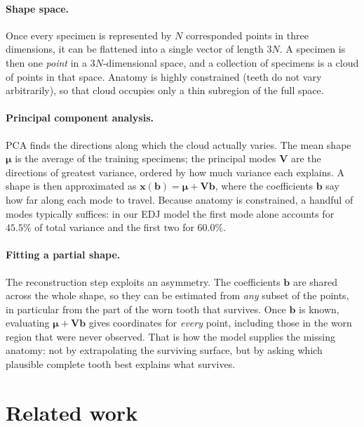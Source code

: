 \documentclass[10pt,a4paper,twocolumn]{article}
\begin{document}
\paragraph{Shape space.}
Once every specimen is represented by $N$ corresponded points in three
dimensions, it can be flattened into a single vector of length $3N$. A specimen
is then one \emph{point} in a $3N$-dimensional space, and a collection of
specimens is a cloud of points in that space. Anatomy is highly constrained
(teeth do not vary arbitrarily), so that cloud occupies only a thin subregion of
the full space.

\paragraph{Principal component analysis.}
PCA finds the directions along which the cloud actually varies. The mean shape
$\bm{\mu}$ is the average of the training specimens; the principal modes
$\mathbf{V}$ are the directions of greatest variance, ordered by how much
variance each explains. A shape is then approximated as
$\mathbf{x}(\mathbf{b}) = \bm{\mu} + \mathbf{V}\mathbf{b}$, where the
coefficients $\mathbf{b}$ say how far along each mode to travel. Because anatomy
is constrained, a handful of modes typically suffices: in our EDJ model the first
mode alone accounts for $45.5\%$ of total variance and the first two for
$60.0\%$.

\paragraph{Fitting a partial shape.}
The reconstruction step exploits an asymmetry. The coefficients $\mathbf{b}$ are
shared across the whole shape, so they can be estimated from \emph{any} subset of
the points, in particular from the part of the worn tooth that survives. Once
$\mathbf{b}$ is known, evaluating $\bm{\mu} + \mathbf{V}\mathbf{b}$ gives
coordinates for \emph{every} point, including those in the worn region that were
never observed. That is how the model supplies the missing anatomy: not by
extrapolating the surviving surface, but by asking which plausible complete tooth
best explains what survives.
\section{Related work}
\label{sec:related}
\end{document}
